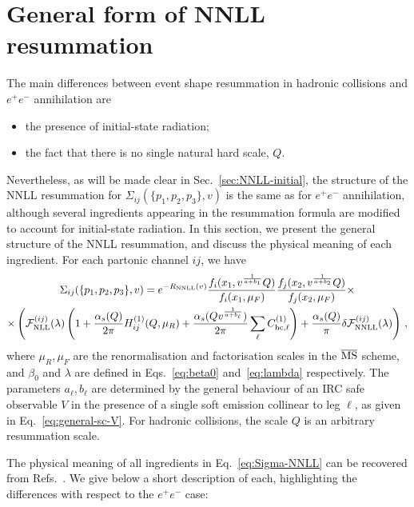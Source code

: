 \section{General form of NNLL resummation}
\label{sec:NNLL-general}

The main differences between event shape resummation in hadronic
collisions and $e^+e^-$ annihilation are
\begin{itemize}
\item the presence of initial-state radiation;
\item the fact that there is no single natural hard scale, $Q$. 
\end{itemize}
Nevertheless, as will be made clear in Sec.~\ref{sec:NNLL-initial}, the structure of the NNLL resummation for $\Sigma_{ij}(\{p_1,p_2,p_3\},v)$ is the same as for $e^+e^-$ annihilation, although several ingredients appearing in the
resummation formula are modified to account for initial-state radiation.
 In this section, we present the general structure of the NNLL resummation, and discuss the physical meaning of each ingredient. 
 For each partonic channel $ij$, we have 
\begin{multline}
  \label{eq:Sigma-NNLL}
  \Sigma_{ij}(\{p_1,p_2,p_3\},v)= e^{-R_{\rm NNLL}(v)} \frac{f_i(x_1,v^{\frac{1}{a+b_1}}Q)}{f_i(x_1,\mu_F)} \frac{f_j(x_2,v^{\frac{1}{a+b_2}}Q)}{f_j(x_2,\mu_F)}
  \times \\ \times
  \left(\mathcal{F}^{(ij)}_{\rm NLL}(\lambda)\left(1+\frac{\alpha_s(Q)}{2\pi}H_{ij}^{(1)}(Q,\mu_R)
      +\frac{\alpha_s(Q v^{\frac{1}{a+b_\ell}})}{2\pi}\sum_{\ell}C_{\mathrm{hc},\ell}^{(1)}\right) +\frac{\alpha_s(Q)}{\pi} \delta\mathcal{F}^{(ij)}_{\rm NNLL}(\lambda)\right)\,,
\end{multline}
where $\mu_R,\mu_F$ are the renormalisation and factorisation
scales in the $\overline{\rm MS}$ scheme, and $\beta_0$ and $\lambda$
are defined in Eqs.~\eqref{eq:beta0} and~\eqref{eq:lambda} respectively.
The parameters $a_\ell, b_\ell$ are determined by the general behaviour 
of an IRC safe observable $V$ in the presence of a single soft emission collinear to leg $\ell$,
as given in Eq.~\eqref{eq:general-sc-V}. For hadronic collisions, the scale $Q$ is an arbitrary resummation
scale.

The physical meaning of all ingredients in
Eq.~\eqref{eq:Sigma-NNLL} can be recovered from
Refs.~\cite{Arpino:2019ozn,Banfi:2018mcq,Banfi:2004yd}. We give
below a short description of each, highlighting the differences with
respect to the $e^+e^-$ case:

